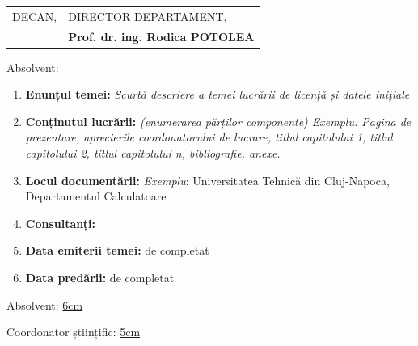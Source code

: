 \begin{tabular}{p{7cm}p{8cm}}
	\hspace{-1cm}DECAN, & DIRECTOR DEPARTAMENT,\\
	\hspace{-1cm}{\bf Prof. dr. ing. Vlad MUREȘAN} & {\bf Prof. dr. ing. Rodica POTOLEA}\\  
\end{tabular}

\vspace{2cm}

\begin{center}
	Absolvent: {\bf \thesisauthor}
	
	\vspace{1cm}
	
	{\bf \thesistitle}
\end{center}

\vspace{5mm}
\begin{enumerate}
	\item {\bf Enunțul temei:} {\it Scurtă descriere a temei lucrării de licență și datele inițiale}
	\item {\bf Conținutul lucrării:} {\it (enumerarea părților componente) Exemplu: Pagina de prezentare, aprecierile coordonatorului de lucrare, titlul capitolului 1, titlul capitolului 2, titlul capitolului n, bibliografie, anexe.}
	\item {\bf Locul documentării:} {\it Exemplu}: Universitatea Tehnică din Cluj-Napoca, Departamentul Calculatoare
	\item {\bf Consultanți:}
	\item {\bf Data emiterii temei:} {\color{blue}de completat} %
	\item {\bf Data predării:} {\color{blue}de completat} %
\end{enumerate}
\vspace{1.2cm}

\hspace{6cm} Absolvent: \uline{6cm} 

\vspace{0.5cm}
\hspace{6cm} Coordonator științific: \uline{5cm} 
\newpage
\begin{center}
	{\department}
\end{center}
\vspace{0.5cm}

